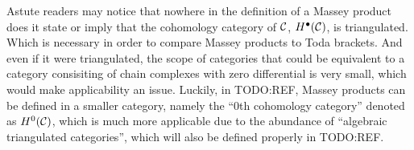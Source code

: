 \begin{remark}
    


\end{remark}

Astute readers may notice that nowhere in the definition of a Massey product does it state or imply that the cohomology category of \( {\mathcal{C}} \), \( H^\bullet({\mathcal{C}}) \), is triangulated. Which is necessary in order to compare Massey products to Toda brackets. And even if it were triangulated, the scope of categories that could be equivalent to a category consisiting of chain complexes with zero differential is very small, which would make applicability an issue. Luckily, in TODO:REF, Massey products can be defined in a smaller category, namely the ``\( 0 \)th cohomology category'' denoted as \( H^0({\mathcal{C}}) \), which is much more applicable due to the abundance of ``algebraic triangulated categories'', which will also be defined properly in TODO:REF.
